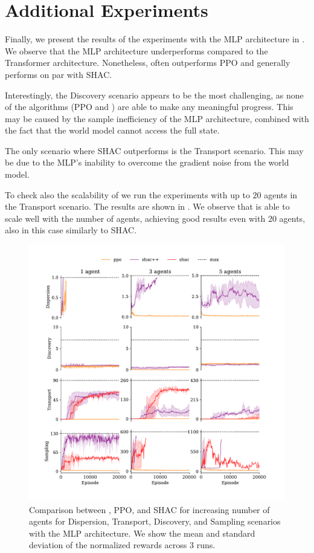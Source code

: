 \section{Additional Experiments}\label{apx:experiments}

Finally, we present the results of the experiments with the MLP architecture in . We observe that the MLP architecture underperforms compared to the Transformer architecture. Nonetheless, \fname{} often outperforms PPO and generally performs on par with SHAC.

Interestingly, the Discovery scenario appears to be the most challenging, as none of the algorithms (PPO and \fname{}) are able to make any meaningful progress. This may be caused by the sample inefficiency of the MLP architecture, combined with the fact that the world model cannot access the full state.

The only scenario where SHAC outperforms \fname{} is the Transport scenario. This may be due to the MLP's inability to overcome the gradient noise from the world model.

To check also the scalability of \fname{} we run the experiments with up to $20$ agents in the Transport scenario. The results are shown in . We observe that \fname{} is able to scale well with the number of agents, achieving good results even with $20$ agents, also in this case similarly to SHAC.
\begin{figure}[t]
    \centering
    \includegraphics[width=\columnwidth]{figs/main-mlp.pdf}
    \caption{Comparison between \fname{}, PPO, and SHAC for increasing number of agents for Dispersion, Transport, Discovery, and Sampling scenarios with the MLP architecture.
    We show the mean and standard deviation of the normalized rewards across $3$ runs.
    }\vspace{0.5cm}
    \label{apx:fig:experiments-mlp}
\end{figure}


